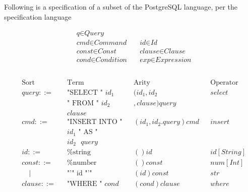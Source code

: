 \documentclass[sigplan,review]{acmart}
\begin{document}
\begin{example}\label{ex:as-sql-lang}
  Following is a specification of a subset of the PostgreSQL\cite{postgresql-about} language, per the specification language


  \[
    \begin{aligned}
       & \textit{q} \in \textit{Query}                                                       \\
       & \textit{cmd} \in \textit{Command}      \quad & \textit{id} \in \textit{Id}          \\
       & \textit{const} \in \textit{Const}      \quad & \textit{clause} \in \textit{Clause}  \\
       & \textit{cond} \in \textit{Condition}   \quad & \textit{exp} \in \textit{Expression} \\
    \end{aligned}
  \]
  \\
  \[
    \begin{aligned}
       & \text{Sort} &  & \text{Term}                     &   & \text{Arity}            &  & \text{Operator} \\
       & query ::=   &  & \text{"SELECT " $id_1$}         &   & (id_1,id_2 &  & select          \\
        &             &  & \text{" FROM " $id_2$}         &   &  ,clause)query \\
        &             &  & \text{$clause$}                                                                       \\
       & cmd ::=     &  & \text{"INSERT INTO "}    &   & (id_1,id_2.query)cmd    &  & insert          \\
       &             &  & \text{$id_1$ " AS "}    &                                                  \\
       &             &  & \text{$id_2$ $query$}    &                                                  \\
       & id ::=      &  & \text{\%string}                 &   & ()id                    &  & id[String]      \\
       & const ::=   &  & \text{\%number}                 &   & ()const                 &  & num[Int]        \\
       & \quad |     &  & \text{"'" id "'"}               &   & (id)const               &  & str             \\
       & clause ::=  &  & \text{"WHERE " $cond$}          &   & (cond)clause            &  & where           \\

\end{aligned}\]
\end{example}
\end{document}
